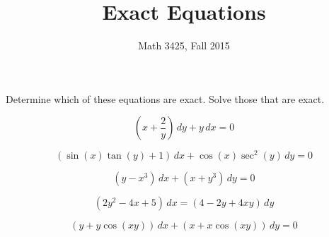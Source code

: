 \documentclass[11pt]{amsart}
\begin{document}
\title{Exact Equations}
\author{Math 3425, Fall 2015}

\maketitle

Determine which of these equations are exact. Solve those that are exact.

\begin{task}
$$
\left( x + \dfrac{2}{y}\right) \, dy + y\, dx = 0
$$
\end{task}

\begin{task}
$$
(\sin(x)\tan(y)+1)\, dx + \cos(x)\sec^2(y)\, dy = 0
$$
\end{task}

\begin{task}
$$
(y-x^3)\, dx + (x+y^3)\, dy = 0
$$
\end{task}


\begin{task}
$$
(2y^2-4x+5)\, dx = (4-2y+4xy)\, dy
$$
\end{task}


\begin{task}
$$
(y+y\cos(xy))\, dx + (x+x\cos(xy))\, dy = 0
$$
\end{task}
\end{document}
